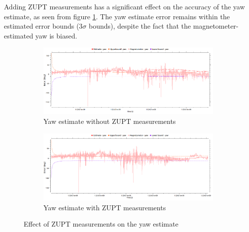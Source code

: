 Adding \gls{ZUPT} measurements has a significant effect on the accuracy of the yaw estimate, as seen from figure \ref{fig:pa:zuptYaw}. The yaw estimate error remains within the estimated error bounds (3$\sigma$ bounds), despite the fact that the magnetometer-estimated yaw is biased.

\begin{figure}[h]
	\centering
    \begin{subfigure}{\textwidth}
        \includegraphics[width=\textwidth]{figs/yaw-without-zupt.png}
        \caption{Yaw estimate without \gls{ZUPT} measurements}
    \end{subfigure}
    \begin{subfigure}{\textwidth}
        \includegraphics[width=\textwidth]{figs/yaw-with-zupt.png}
        \caption{Yaw estimate with \gls{ZUPT} measurements}
    \end{subfigure}
    \caption{Effect of \gls{ZUPT} measurements on the yaw estimate}
    \label{fig:pa:zuptYaw}
\end{figure}

